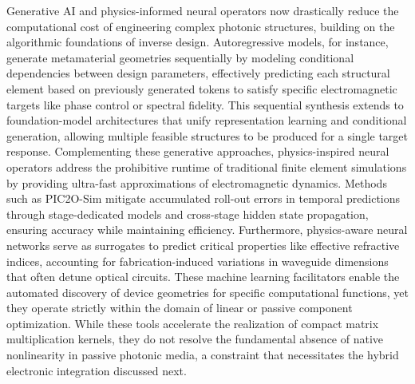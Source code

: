 \documentclass[11pt]{article}
\begin{document}
Generative AI and physics-informed neural operators now drastically reduce the computational cost of engineering complex photonic structures, building on the algorithmic foundations of inverse design. Autoregressive models, for instance, generate metamaterial geometries sequentially by modeling conditional dependencies between design parameters, effectively predicting each structural element based on previously generated tokens to satisfy specific electromagnetic targets like phase control or spectral fidelity. \citep{doi_10_48550_arxiv_2507_06853_b7161f49} This sequential synthesis extends to foundation-model architectures that unify representation learning and conditional generation, allowing multiple feasible structures to be produced for a single target response. Complementing these generative approaches, physics-inspired neural operators address the prohibitive runtime of traditional finite element simulations by providing ultra-fast approximations of electromagnetic dynamics. \citep{doi_10_1016_j_compositesb_2025_112935_31ebab19} Methods such as PIC2O-Sim mitigate accumulated roll-out errors in temporal predictions through stage-dedicated models and cross-stage hidden state propagation, ensuring accuracy while maintaining efficiency. \citep{doi_10_48550_arxiv_2406_17810_813bd2a3} Furthermore, physics-aware neural networks serve as surrogates to predict critical properties like effective refractive indices, accounting for fabrication-induced variations in waveguide dimensions that often detune optical circuits. \citep{doi_10_1007_s11082_024_08009_8_0f7f241e} These machine learning facilitators enable the automated discovery of device geometries for specific computational functions, yet they operate strictly within the domain of linear or passive component optimization. While these tools accelerate the realization of compact matrix multiplication kernels, they do not resolve the fundamental absence of native nonlinearity in passive photonic media, a constraint that necessitates the hybrid electronic integration discussed next. \citep{doi_10_1109_access_2026_3697666_bd5258a6} \citep{doi_10_48550_arxiv_2406_17810_813bd2a3} \citep{doi_10_1007_s11082_024_08009_8_0f7f241e} \citep{doi_10_1063_5_0159264_6f483b1f}
\end{document}
